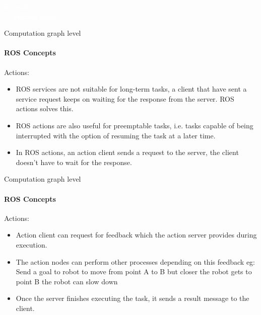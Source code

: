 \documentclass{beamer}
\begin{document}
\begin{frame}[plain]{}  
    \centering
    {\huge \textcolor{white}{Example \\ (TurtleSim again)} }
   \end{frame}
     
        
\begin{frame}{Computation graph level}
    \framesubtitle{ROS Concepts}
    {\huge Actions:}
    \vspace{0.2cm}
    \begin{itemize}
        \item ROS services are not suitable for long-term tasks, a client that have sent a service request keeps on waiting for the response from the server. ROS actions solves this.
        
        \item ROS actions are also useful for preemptable tasks, i.e. tasks capable of being interrupted with the option of resuming the task at a later time.
        
        \item In ROS actions, an action client sends a request to the server, the client doesn't have to wait for the response.

    \end{itemize}  
\end{frame}


\begin{frame}{Computation graph level}
    \framesubtitle{ROS Concepts}
    {\huge Actions:}
    \vspace{0.2cm}
    \begin{itemize}        
        \item Action client can  request for feedback which the action server provides during execution. 
        \item The action nodes can perform other processes depending on this feedback
        eg: Send a goal to robot to move from point A to B but closer the robot gets to point B the robot can slow down 
        \item Once the server finishes executing the task, it sends a result message to the client.
    \end{itemize}  
\end{frame}
\end{document}
